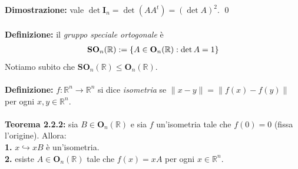 \documentclass{article}
\begin{document}
\textbf{Dimostrazione:} vale $\det \mathbf{I}_n = \det (AA^t) = (\det A)^2$. \qed \\ \\
\textbf{Definizione:} il \textit{gruppo speciale ortogonale} è
\begin{gather}
    \mathbf{SO}_n(\mathbb{R}) := \{ A \in \mathbf{O}_n(\mathbb{R}) : \det A = 1 \} \notag
\end{gather}
Notiamo subito che $\mathbf{SO}_n(\mathbb{R}) \leq \mathbf{O}_n(\mathbb{R})$. \\ \\
\textbf{Definizione:} $f : \mathbb{R}^n \longrightarrow \mathbb{R}^n$ si dice \textit{isometria} se $\| x - y \| = \| f(x) - f(y) \|$ per ogni $x, y \in \mathbb{R}^n$. \\ \\
\textbf{Teorema 2.2.2:} sia $B \in \mathbf{O}_n(\mathbb{R})$ e sia $f$ un'isometria tale che $f(0) = 0$ (fissa l'origine). Allora: \\
\textbf{1.} $x \hookrightarrow xB$ è un'isometria. \\
\textbf{2.} esiste $A \in \mathbf{O}_n(\mathbb{R})$ tale che $f(x) = xA$ per ogni $x \in \mathbb{R}^n$. \\
\end{document}
